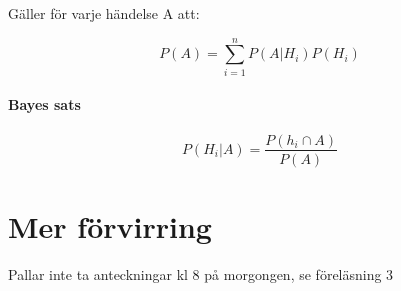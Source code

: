 \documentclass[12pt]{article} %
\begin{document}
Gäller för varje händelse A att:

\[
    P(A) = \sum_{i = 1}^{n} P(A | H_i)P(H_i)
\]

\paragraph{Bayes sats}
\[
    P(H_i | A) = \frac{P(h_i \cap A)}{P(A)}
\]

\section{Mer förvirring}

Pallar inte ta anteckningar kl 8 på morgongen, se föreläsning 3








\end{document}
